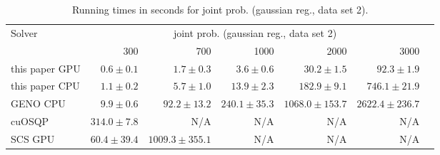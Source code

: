 
\begin{table}[h!]
\begin{center}
  \small
  \begin{tabular}{l*{6}{r}}
    \toprule
    \multirow{2}{*}{Solver} & \multicolumn{5}{c}{joint prob. (gaussian reg., data set 2)} \\
    \cmidrule{2-6}
                   & 300           & 700 & 1000 & 2000 & 3000 \\
    \midrule
    this paper GPU & $0.6\pm 0.1$    & $1.7\pm 0.3$ & $3.6\pm 0.6$ & $30.2\pm 1.5$ & $92.3\pm 1.9$ \\
    this paper CPU & $1.1\pm 0.2$    & $5.7\pm 1.0$ & $13.9\pm 2.3$ & $182.9\pm 9.1$ & $746.1\pm 21.9$ \\
    GENO CPU       & $9.9\pm 0.6$    & $92.2\pm 13.2$ & $240.1\pm 35.3$ & $1068.0\pm 153.7$ & $2622.4\pm 236.7$ \\
    cuOSQP         & $314.0\pm 7.8$  & N/A & N/A & N/A & N/A \\
    SCS GPU        & $60.4\pm 39.4$  & $1009.3\pm 355.1$ & N/A & N/A & N/A \\
    \bottomrule
  \end{tabular}%
  \caption{Running times in seconds for joint prob. (gaussian reg., data set 2).}
  \end{center}
\end{table}
